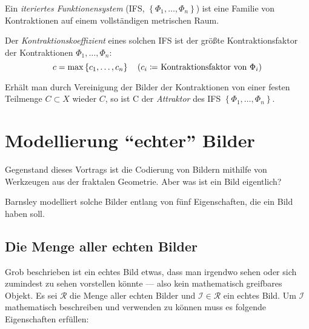 \documentclass[afourpaper]{latex-classes/handout}
\begin{document}
Ein \emph{iteriertes Funktionensystem} (IFS, \( \left \{ \Phi_1, \dots, \Phi_n \right \} \)) ist  eine Familie von Kontraktionen auf einem vollständigen metrischen Raum.

Der \emph{Kontraktionskoeffizient} eines solchen IFS ist der größte Kontraktionsfaktor der Kontraktionen \( \Phi_1, \dots, \Phi_n \):
\begin{equation*}
  c = \max\left \{ c_1, \dots,c_n \right \} \quad \text{(\( c_i \coloneqq \) Kontraktionsfaktor von \( \Phi_i \))}
\end{equation*}

Erhält man durch Vereinigung der Bilder der Kontraktionen von einer festen Teilmenge \( C \subset X \) wieder \( C \), so ist C der \emph{Attraktor} des IFS \( \left \{ \Phi_1, \dots, \Phi_n \right \} \).

\section{Modellierung ``echter'' Bilder}

Gegenstand dieses Vortrags ist die Codierung von Bildern mithilfe von Werkzeugen aus der fraktalen Geometrie. Aber was ist ein Bild eigentlich?

Barnsley modelliert solche Bilder entlang von fünf Eigenschaften, die ein Bild haben soll.

\subsection{Die Menge aller echten Bilder}

Grob beschrieben ist ein echtes Bild etwas, dass man irgendwo sehen oder sich zumindest zu sehen vorstellen könnte --- also kein mathematisch greifbares Objekt. Es sei \( \mathcal{R} \) die Menge aller echten Bilder und \( \mathcal{I} \in \mathcal{R} \) ein echtes Bild. Um \( \mathcal{I} \) mathematisch beschreiben und verwenden zu können muss es folgende Eigenschaften erfüllen:
\end{document}
